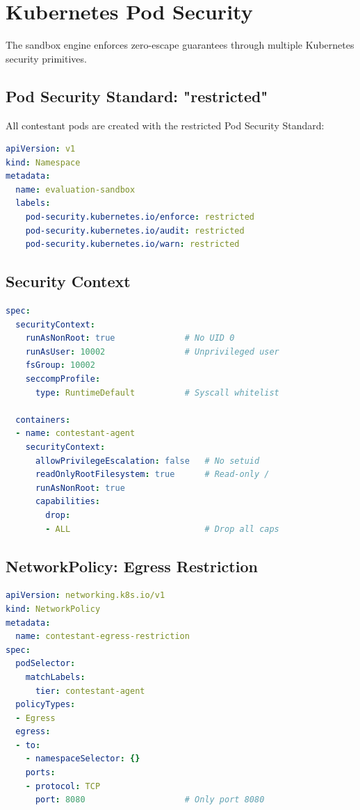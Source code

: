 \documentclass[10pt,a4paper,oneside]{report}
\begin{document}
\section{Kubernetes Pod Security}

The sandbox engine enforces zero-escape guarantees through multiple Kubernetes security primitives.

\subsection{Pod Security Standard: "restricted"}

All contestant pods are created with the restricted Pod Security Standard:

\begin{lstlisting}[language=yaml]
apiVersion: v1
kind: Namespace
metadata:
  name: evaluation-sandbox
  labels:
    pod-security.kubernetes.io/enforce: restricted
    pod-security.kubernetes.io/audit: restricted
    pod-security.kubernetes.io/warn: restricted
\end{lstlisting}

\subsection{Security Context}

\begin{lstlisting}[language=yaml]
spec:
  securityContext:
    runAsNonRoot: true              # No UID 0
    runAsUser: 10002                # Unprivileged user
    fsGroup: 10002
    seccompProfile:
      type: RuntimeDefault          # Syscall whitelist

  containers:
  - name: contestant-agent
    securityContext:
      allowPrivilegeEscalation: false   # No setuid
      readOnlyRootFilesystem: true      # Read-only /
      runAsNonRoot: true
      capabilities:
        drop:
        - ALL                           # Drop all caps
\end{lstlisting}

\subsection{NetworkPolicy: Egress Restriction}

\begin{lstlisting}[language=yaml]
apiVersion: networking.k8s.io/v1
kind: NetworkPolicy
metadata:
  name: contestant-egress-restriction
spec:
  podSelector:
    matchLabels:
      tier: contestant-agent
  policyTypes:
  - Egress
  egress:
  - to:
    - namespaceSelector: {}
    ports:
    - protocol: TCP
      port: 8080                    # Only port 8080
\end{lstlisting}
\end{document}
